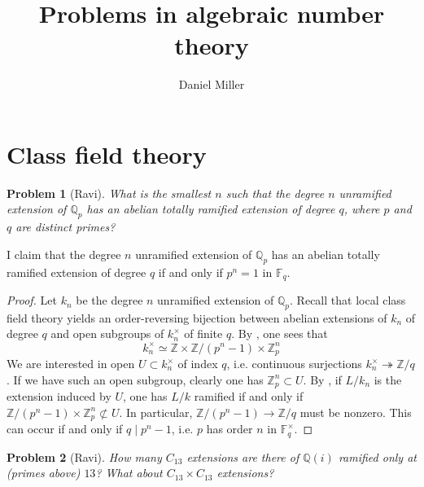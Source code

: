 \documentclass{article}
\title{Problems in algebraic number theory}
\author{Daniel Miller}
\newtheorem{problem}{Problem}
\newcommand{\dF}{\mathbb{F}}
\newcommand{\dQ}{\mathbb{Q}}
\newcommand{\dZ}{\mathbb{Z}}
\begin{document}
\maketitle










\section{Class field theory}





\begin{problem}[Ravi]
What is the smallest $n$ such that the degree $n$ unramified extension of 
$\dQ_p$ has an abelian totally ramified extension of degree $q$, where $p$ and 
$q$ are distinct primes?
\end{problem}
I claim that the degree $n$ unramified extension of $\dQ_p$ has an abelian 
totally ramified extension of degree $q$ if and only if $p^n=1$ in $\dF_q$. 
\begin{proof}
Let $k_n$ be the degree $n$ unramified extension of $\dQ_p$. Recall 
\cite[V.1.4]{Neu} that local class field theory yields an 
order-reversing bijection between abelian extensions of $k_n$ of degree $q$ 
and open subgroups of $k_n^\times$ of finite $q$. By \cite[II.5.7]{Neu}, one 
sees that 
\[
  k_n^\times \simeq \dZ \times \dZ/(p^n-1) \times \dZ_p^n
\]
We are interested in open $U\subset k_n^\times$ of index $q$, i.e. continuous 
surjections $k_n^\times \twoheadrightarrow \dZ/q$. If we have such an open 
subgroup, clearly one has $\dZ_p^n\subset U$. By \cite[V.1.7]{Neu}, if $L/k_n$ 
is the extension induced by $U$, one has $L/k$ ramified if and only if 
$\dZ/(p^n-1)\times \dZ_p^n\not\subset U$. In particular, $\dZ/(p^n-1)\to\dZ/q$ 
must be nonzero. This can occur if and only if $q\mid p^n-1$, i.e. $p$ has 
order $n$ in $\dF_q^\times$.
\end{proof}






\begin{problem}[Ravi]
How many $C_{13}$ extensions are there of $\dQ(i)$ ramified only at (primes 
above) $13$? What about $C_{13}\times C_{13}$ extensions?
\end{problem}
\end{document}
